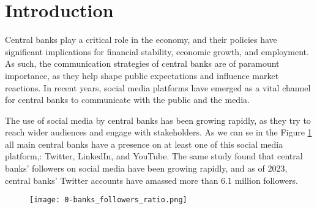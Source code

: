 \documentclass[fleqn,10pt]{SelfArx} %
\begin{document}
\maketitle %

\tableofcontents %

\thispagestyle{empty} %


\section*{Introduction} %


Central banks play a critical role in the economy, and their policies have significant implications for financial stability, economic growth, and employment. As such, the communication strategies of central banks are of paramount importance, as they help shape public expectations and influence market reactions. In recent years, social media platforms have emerged as a vital channel for central banks to communicate with the public and the media.

The use of social media by central banks has been growing rapidly, as they try to reach wider audiences and engage with stakeholders. As we can se in the Figure \ref{fig:followers_ratio} all main central banks have a presence on at least one of this social media platform,: Twitter, LinkedIn, and YouTube. The same study found that central banks' followers on social media have been growing rapidly, and as of 2023, central banks' Twitter accounts have amassed more than 6.1 million followers.

\begin{figure}[ht]\centering
	\texttt{[image: 0-banks\_followers\_ratio.png]}
	\caption{}
	\label{fig:followers_ratio}
\end{figure}
\end{document}
